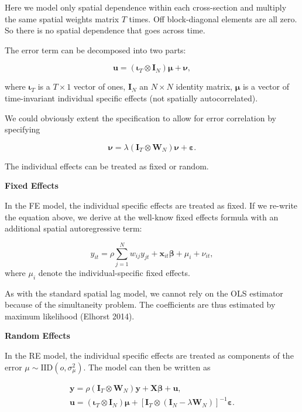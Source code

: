 \documentclass[
  letterpaper,
]{scrbook}
\begin{document}
Here we model only spatial dependence within each cross-section and
multiply the same spatial weights matrix \(T\) times. Off block-diagonal
elements are all zero. So there is no spatial dependence that goes
across time.

The error term can be decomposed into two parts:

\[
        {\boldsymbol{\mathbf{u}}}= (\boldsymbol{\mathbf{\iota}}_T \otimes {\boldsymbol{\mathbf{I}}_N})\boldsymbol{\mathbf{\mu}}+ {\boldsymbol{\mathbf{\nu}}},
\]

where \(\boldsymbol{\mathbf{\iota}}_T\) is a \(T \times 1\) vector of
ones, \({\boldsymbol{\mathbf{I}}_N}\) an \(N \times N\) identity matrix,
\(\boldsymbol{\mathbf{\mu}}\) is a vector of time-invariant individual
specific effects (not spatially autocorrelated).

We could obviously extent the specification to allow for error
correlation by specifying

\[
        {\boldsymbol{\mathbf{\nu}}}= \lambda(\boldsymbol{\mathbf{I}}_T \otimes {\boldsymbol{\mathbf{W}}_N})\boldsymbol{\mathbf{\nu }}+ {\boldsymbol{\mathbf{\varepsilon}}}.
\]

The individual effects can be treated as fixed or random.

\textbf{Fixed Effects}

In the FE model, the individual specific effects are treated as fixed.
If we re-write the equation above, we derive at the well-know fixed
effects formula with an additional spatial autoregressive term:

\[
        {y_{it}}= \rho\sum_{j=1}^Nw_{ij}y_{jt} + \boldsymbol{\mathbf{x}}_{it}\boldsymbol{\mathbf{\beta }}+ \mu_i + \nu_{it},
\] where \(\mu_i\) denote the individual-specific fixed effects.

As with the standard spatial lag model, we cannot rely on the OLS
estimator because of the simultaneity problem. The coefficients are thus
estimated by maximum likelihood (Elhorst 2014).

\textbf{Random Effects}

In the RE model, the individual specific effects are treated as
components of the error \(\mu \sim \mathrm{IID}(o, \sigma_\mu^2)\). The
model can then be written as

\[
\begin{split}
        {\boldsymbol{\mathbf{y}}}= \rho(\boldsymbol{\mathbf{I}}_T\otimes {\boldsymbol{\mathbf{W}}_N}){\boldsymbol{\mathbf{y}}}+{\boldsymbol{\mathbf{X}}}{\boldsymbol{\mathbf{\beta}}}+ {\boldsymbol{\mathbf{u}}}, \\
        {\boldsymbol{\mathbf{u}}}= (\boldsymbol{\mathbf{\iota}}_T \otimes {\boldsymbol{\mathbf{I}}_N})\boldsymbol{\mathbf{\mu}}+ [\boldsymbol{\mathbf{I}}_T \otimes (\boldsymbol{\mathbf{I}}_N -  \lambda{\boldsymbol{\mathbf{W}}_N})]^{-1} {\boldsymbol{\mathbf{\varepsilon}}}.
\end{split}     
\]
\end{document}
